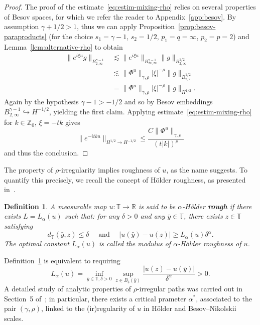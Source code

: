 \documentclass[11pt,oneside,reqno]{amsart}
\newcommand{\tmdfn}[1]{\textbf{#1}}
\newtheorem{definition}[theorem]{Definition}
\numberwithin{equation}{section}
\begin{document}
\begin{proof}
  The proof of the estimate~\eqref{eq:estim-mixing-rho} relies on several
  properties of Besov spaces, for which we refer the reader to
  Appendix~\ref{app:besov}. By assumption $\gamma + 1 / 2 > 1$,
  thus we can apply Proposition~\ref{prop:besov-paraproducts}
  (for the choice $s_1 = \gamma - 1$, $s_2 = 1 / 2$, $p_1 = q = \infty$, $p_2
  = p = 2$) and Lemma~\ref{lem:alternative-rho} to obtain
%  
  \begin{align*}
    \| e^{i \xi u} g \|_{B^{\gamma - 1}_{2, \infty}} & \lesssim \| e^{i \xi u}
    \|_{B^{\gamma - 1}_{\infty, \infty}} \| g \|_{B^{1 / 2}_{2, \infty}}\\
    & \lesssim \| \Phi^u \|_{\gamma, \rho}  | \xi |^{- \rho} \| g \|_{B^{1 /
    2}_{2, 2}}\\
    & = \| \Phi^u \|_{\gamma, \rho}  | \xi |^{- \rho} \| g \|_{H^{1 / 2}} .
  \end{align*}
%  
  Again by the hypothesis $\gamma - 1 > - 1 / 2$ and so by Besov embeddings
  $B^{\gamma - 1}_{2, \infty} \hookrightarrow H^{- 1 / 2}$, yielding the first
  claim. Applying estimate~\eqref{eq:estim-mixing-rho} for $k \in
  \mathbb{Z}_0$, $\xi = - t k$ gives
  \[ \| e^{- i t k u} \|_{H^{1 / 2} \rightarrow H^{- 1 / 2}} \leqslant \frac{C
     \| \Phi^u \|_{\gamma, \rho} }{(t | k |)^{\rho}} \]
  and thus the conclusion.
\end{proof}

The property of $\rho$-irregularity implies roughness of $u$, as the name
suggests. To quantify this precisely, we recall the concept of H\"{o}lder
roughness, as presented in~{\cite{frizhairer}}.

\begin{definition}
  \label{def:holder-roughness}A measurable map $u : \mathbb{T} \rightarrow
  \mathbb{R}$ is said to be $\alpha$-H\"{o}lder {\tmdfn{rough}} if there
  exists $L = L_{\alpha} (u)$ such that: for any $\delta > 0$ and any $\bar{y}
  \in \mathbb{T}$, there exists $z \in \mathbb{T}$ satisfying
  \[ d_{\mathbb{T}} (\bar{y}, z) \leqslant \delta \quad \text{ and } \quad | u
     (\bar{y}) - u (z) | \geqslant L_{\alpha} (u) \delta^{\alpha} . \]
  The optimal constant $L_{\alpha} (u)$ is called the modulus of
  $\alpha$-H\"{o}lder roughness of $u$.
\end{definition}

Definition~\ref{def:holder-roughness} is equivalent to requiring
\begin{equation}
  L_{\alpha} (u) = \inf_{\bar{y} \in \mathbb{T}, \delta > 0} \sup_{z \in
  B_{\delta} (\bar{y})} \frac{| u (z) - u (\bar{y}) |}{\delta^{\alpha}} > 0.
\end{equation}
A detailed study of analytic properties of $\rho$-irregular paths was carried
out in Section~5 of~{\cite{galeati2020prevalence}}; in
particular, there exists a critical prameter $\alpha^{\ast}$, associated to
the pair $(\gamma, \rho)$, linked to the (ir)regularity of $u$ in H\"{o}lder
and Besov--Nikolskii scales.
\end{document}
